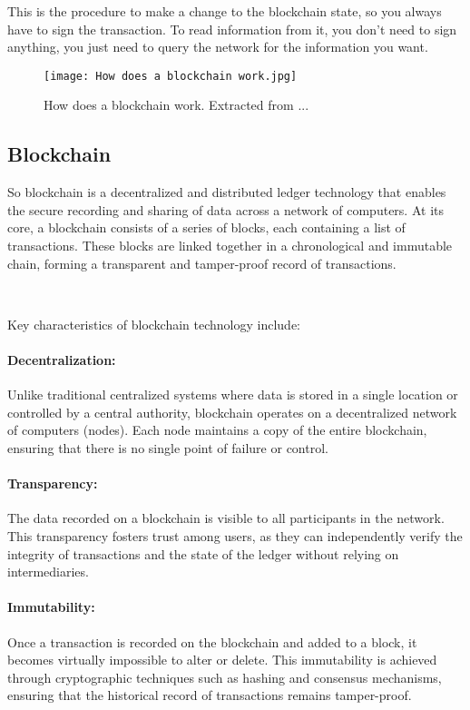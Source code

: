 This is the procedure to make a change to the blockchain state, so you always have to sign the transaction. To read information from it, you don't need to sign anything, you just need to query the network for the information you want.

\begin{figure}[H]
    \texttt{[image: How does a blockchain work.jpg]}
    \centering
    \caption[How does a blockchain work]{How does a blockchain work. Extracted from ...}
    \label{fig:how_does_a_blockchain_work}
\end{figure}

\subsection{Blockchain}
\label{subsec:blockchain}

So blockchain is a decentralized and distributed ledger technology that enables the secure recording and sharing of data across a network of computers. At its core, a blockchain consists of a series of blocks, each containing a list of transactions. These blocks are linked together in a chronological and immutable chain, forming a transparent and tamper-proof record of transactions.

~

Key characteristics of blockchain technology include:

\paragraph{Decentralization:}
Unlike traditional centralized systems where data is stored in a single location or controlled by a central authority, blockchain operates on a decentralized network of computers (nodes). Each node maintains a copy of the entire blockchain, ensuring that there is no single point of failure or control.

\paragraph{Transparency:}
The data recorded on a blockchain is visible to all participants in the network. This transparency fosters trust among users, as they can independently verify the integrity of transactions and the state of the ledger without relying on intermediaries.

\paragraph{Immutability:}
Once a transaction is recorded on the blockchain and added to a block, it becomes virtually impossible to alter or delete. This immutability is achieved through cryptographic techniques such as hashing and consensus mechanisms, ensuring that the historical record of transactions remains tamper-proof.

